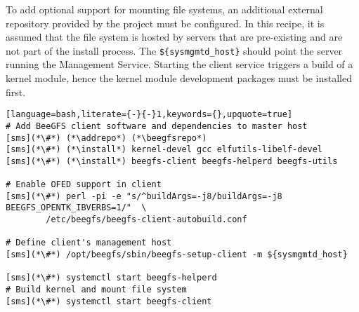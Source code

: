 To add optional support for mounting \beegfs{} file systems, an
additional external \pkgmgr{} repository provided by the \beegfs{} project must be
configured.  In this recipe, it is
assumed that the file system is hosted by servers that are pre-existing
and are not part of the install process. The \texttt{\$\{sysmgmtd\_host\}} should
point the server running the \beegfs{} Management Service. Starting the client service triggers
a build of a kernel module, hence the kernel module development packages must be
installed first.

\begin{lstlisting}[language=bash,literate={-}{-}1,keywords={},upquote=true]
# Add BeeGFS client software and dependencies to master host
[sms](*\#*) (*\addrepo*) (*\beegfsrepo*)
[sms](*\#*) (*\install*) kernel-devel gcc elfutils-libelf-devel
[sms](*\#*) (*\install*) beegfs-client beegfs-helperd beegfs-utils

# Enable OFED support in client
[sms](*\#*) perl -pi -e "s/^buildArgs=-j8/buildArgs=-j8 BEEGFS_OPENTK_IBVERBS=1/"  \
        /etc/beegfs/beegfs-client-autobuild.conf

# Define client's management host
[sms](*\#*) /opt/beegfs/sbin/beegfs-setup-client -m ${sysmgmtd_host}

[sms](*\#*) systemctl start beegfs-helperd
# Build kernel and mount file system
[sms](*\#*) systemctl start beegfs-client
\end{lstlisting}


